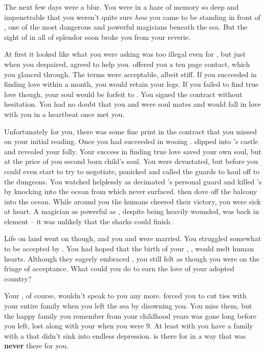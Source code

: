 \documentclass[char]{NeptuneBall}
\begin{document}
The next few days were a blur. You were in a haze of memory so deep and impenetrable that you weren't quite sure \emph{how} you came to be standing in front of \cWitch{}, one of the most dangerous and powerful magicians beneath the sea. But the sight of \cWitch{\them} in all of \cWitch{\their} splendor soon broke you from your reverie.

At first it looked like what you were asking was too illegal even for \cWitch{}, but just when you despaired, \cWitch{\they} agreed to help you. \cWitch{} offered you a ten page contact, which you glanced through. The terms were acceptable, albeit stiff. If you succeeded in finding love within a month, you would retain your legs. If you failed to find true love though, your soul would be forfeit to \cWitch{}. You signed the contract without hesitation. You had no doubt that you and \cEric{} were soul mates and \cEric{\they} would fall in love with you in a heartbeat once \cEric{} met you.

Unfortunately for you, there was some fine print in the contract that you missed on your initial reading. Once you had succeeded in wooing \cEric{}. \cWitch{} slipped into \cEric{}'s castle and revealed your folly. Your success in finding true love saved your own soul, but at the price of you second born child's soul. You were devastated, but before you could even start to try to negotiate, \cEric{} panicked and called the guards to haul \cWitch{} off to the dungeons. You watched helplessly as \cWitch{} decimated \cEric{}'s personal guard and killed \cEric{}'s \cPrince{\sibling} \cSlave{} by knocking \cSlave{\them} into the ocean from which \cSlave{\they} never surfaced. \cWitch{} then dove off the balcony into the ocean. While around you the humans cheered their victory, you were sick at heart. A magician as powerful as \cWitch{}, despite being heavily wounded, was back in \cWitch{\their} element -- it was unlikely that the sharks could finish \cWitch{\them}.

Life on land went on though, and you and \cEric{} were married. You struggled somewhat to be accepted by \pAmerica{}. You had hoped that the birth of your \cWillow{\offspring}, \cWillow{}, would melt human hearts. Although they eagerly embraced \cWillow{}, you still felt as though you were on the fringe of acceptance. What could you do to earn the love of your adopted country? 

Your \cKing{\parent}, of course, wouldn't speak to you any more. \cKing{\They} forced you to cut ties with your entire family when you left the sea by disowning you. You miss them, but the happy family you remember from your childhood years was gone long before you left, lost along with your \cAthena{\parent} when you were 9. At least with \cEric{} you have a family with a \cEric{\parent} that didn't sink into endless depression. \cEric{} is there for \cWillow{} in a way that \cKing{} was {\bf never} there for you.
\end{document}
